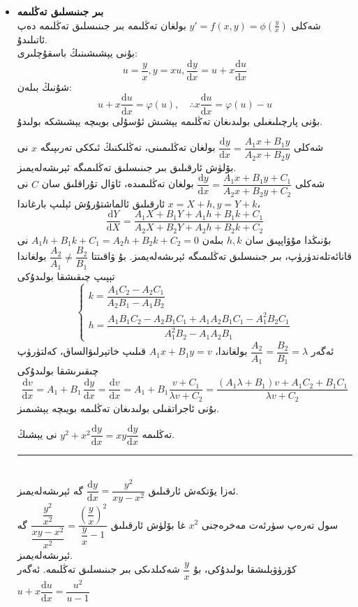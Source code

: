 \begin{itemize}
\item \textbf{بىر جىنىسلىق تەڭلىمە}\\
شەكلى 
$y'=f(x,y)=\phi(\frac{y}{x})$
بولغان تەڭلىمە بىر جىنىسلىق تەڭلىمە دەپ ئاتىلىدۇ.\\
بۇنى يېشىشىنىڭ باسقۇچلىرى:
$$u=\dfrac{y}{x}, y=xu, \dfrac{\textrm{d}y}{\textrm{d}x}=u+x\dfrac{\textrm{d}u}{\textrm{d}x}$$
شۇنىڭ بىلەن:
$$
u+x\dfrac{\textrm{d}u}{\textrm{d}x}=\varphi(u),\quad \therefore x\dfrac{\textrm{d}u}{\textrm{d}x}=\varphi(u)-u
$$
بۇنى پارچىلىغىلى بولىدىغان تەڭلىمە يېشىش ئۇسۇلى بويىچە يېشىشكە بولىدۇ.

\begin{colorful}[pink]
شەكلى
$\dfrac{\textrm{d}y}{\textrm{d}x}=\dfrac{A_1x+B_1y}{A_2x+B_2y}$
بولغان تەڭلىمىنى، تەڭلىكنىڭ ئىككى تەرىپىگە
$x$
نى بۆلۈش ئارقىلىق بىر جىنىسلىق تەڭلىمىگە ئېرىشەلەيمىز.\\
شەكلى 
$\dfrac{\textrm{d}y}{\textrm{d}x}=\dfrac{A_1x+B_1y+C_1}{A_2x+B_2y+C_2}$
بولغان تەڭلىمىدە، ئاۋال تۇراقلىق سان
$C$
نى
$x=X+h,y=Y+k$
ئارقىلىق ئالماشتۇرۇش ئېلىپ بارغاندا،
$$\dfrac{\textrm{d}Y}{\textrm{d}X}=\dfrac{A_1X+B_1Y+A_1h+B_1k+C_1}{A_2X+B_2Y+A_2h+B_2k+C_2}$$
بۇنىڭدا مۇۋاپپىق سان
$h,k$
بىلەن 
$A_1h+B_1k+C_1=A_2h+B_2k+C_2=0$
نى قانائەتلەندۈرۈپ، بىر جىنىسلىق تەڭلىمىگە ئېرىشەلەيمىز. بۇ ۋاقىتتا 
$\dfrac{A_2}{A_1}\neq\dfrac{B_2}{B_1}$
بولغاندا تېپىپ چىقىشقا بولىدۇكى
$$\left\{\begin{array}{l}
	k=\dfrac{A_1C_2-A_2C_1}{A_2B_1-A_1B_2} \\  
	h=\dfrac{A_1B_1C_2-A_2B_1C_1+A_1A_2B_1C_1-A_1^2B_2C_1}{A_1^2B_2-A_1A_2B_1}
\end{array}
\right.$$
ئەگەر 
$\dfrac{A_2}{A_1}=\dfrac{B_2}{B_1}=\lambda$
بولغاندا، 
$A_1x+B_1y=v$
قىلىپ خاتېرلىۋالساق، كەلتۈرۈپ چىقىرىشقا بولىدۇكى
$$
\dfrac{\textrm{d}v}{\textrm{d}x}=A_1+B_1\,\dfrac{\textrm{d}y}{\textrm{d}x}
=\dfrac{\textrm{d}v}{\textrm{d}x}=A_1+B_1\dfrac{v+C_1}{\lambda v+C_2}
=\dfrac{(A_1\lambda+B_1)v+A_1C_2+B_1C_1}{\lambda v+C_2}
$$
بۇنى ئاجراتقىلى بولىدىغان تەڭلىمە بويىچە يېشىمىز.


\end{colorful}

\begin{myexample}
	تەڭلىمە
$y^2+x^2\dfrac{\textrm{d}y}{\textrm{d}x}=xy\dfrac{\textrm{d}y}{\textrm{d}x}$
	نى يېشىڭ.
	\\\rule{\linewidth}{0.05em}\\
	ئەزا يۆتكەش ئارقىلىق
	$\dfrac{\textrm{d}y}{\textrm{d}x}=\dfrac{y^2}{xy-x^2}$
	گە ئېرىشەلەيمىز.\\سول تەرەپ سۈرئەت مەخرەجنى 
	$x^2$
	غا بۆلۈش ئارقىلىق
	$\dfrac{\dfrac{y^2}{x^2}}{\dfrac{xy-x^2}{x^2}}=\dfrac{\left(\dfrac{y}{x}\right)^2}{\dfrac{y}{x}-1}$
	گە ئېرىشەلەيمىز.\\كۆرۈۋېلىشقا بولىدۇكى، بۇ $\dfrac{y}{x}$ شەكىلدىكى بىر جىنىسلىق تەڭلىمە. ئەگەر
	$u+x\dfrac{\textrm{d}u}{\textrm{d}x}=\dfrac{u^2}{u-1}$


\end{myexample}
\end{itemize}
